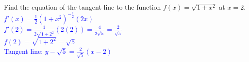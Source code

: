 \documentclass{ximera}
\begin{document}
\begin{exercise}
    Find the equation of the tangent line to the function $f(x)=\sqrt{1+x^2}$ at $x=2$.\\
    \textcolor{blue}{$f'(x)=\frac12(1+x^2)^{-\frac12}(2x)$\\
    $f'(2)=\frac{1}{2\sqrt{1+2^2}}(2(2))=\frac{4}{2\sqrt{5}}=\frac{2}{\sqrt{5}}$\\
    $f(2)=\sqrt{1+2^2}=\sqrt{5}$\\
    Tangent line: $y-\sqrt{5}=\frac{2}{\sqrt{5}}(x-2)$}
\end{exercise}
\end{document}
